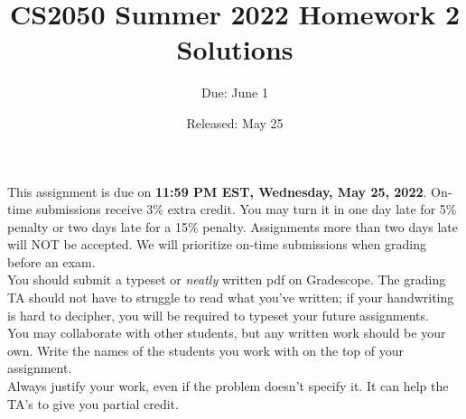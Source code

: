 \documentclass{article}
\title{CS2050 Summer 2022 Homework 2 Solutions}
\author{Due: June 1}
\date{Released: May 25}
\begin{document}
\maketitle

This assignment is due on \textbf{11:59 PM EST, Wednesday, May 25, 2022}.  On-time submissions receive 3\% extra credit. You may turn it in one day late for 5\% penalty or two days late for a 15\% penalty. Assignments more than two days late will NOT be accepted.  We will prioritize on-time submissions when grading before an exam. \\ 

You should submit a typeset or \emph{neatly} written pdf on Gradescope.  The grading TA should not have to struggle to read what you've written; if your handwriting is hard to decipher, you will be required to typeset your future assignments.\\ 

You may collaborate with other students, but any written work should be your own. Write the names of the students you work with on the top of your assignment.\\

Always justify your work, even if the problem doesn't specify it. It can help the TA's to give you partial credit.



\clearpage
\end{document}
